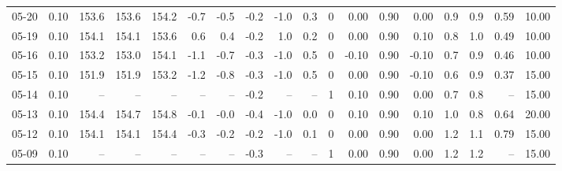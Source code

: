 \begin{threeparttable}
{\begin{tabular}{lrrrrrrrrrrrrrrrrr}
  05-20 &     0.10 & 153.6 & 153.6 & 154.2 &       -0.7 &           -0.5 &                      -0.2 &                     -1.0 &                 0.3 &              0 &       0.00 &      0.90 &           0.00 &              0.9 &                 0.9 &            0.59 &                  10.00 \\
  05-19 &     0.10 & 154.1 & 154.1 & 153.6 &        0.6 &            0.4 &                      -0.2 &                      1.0 &                 0.2 &              0 &       0.00 &      0.90 &           0.10 &              0.8 &                 1.0 &            0.49 &                  10.00 \\
  05-16 &     0.10 & 153.2 & 153.0 & 154.1 &       -1.1 &           -0.7 &                      -0.3 &                     -1.0 &                 0.5 &              0 &      -0.10 &      0.90 &          -0.10 &              0.7 &                 0.9 &            0.46 &                  10.00 \\
  05-15 &     0.10 & 151.9 & 151.9 & 153.2 &       -1.2 &           -0.8 &                      -0.3 &                     -1.0 &                 0.5 &              0 &       0.00 &      0.90 &          -0.10 &              0.6 &                 0.9 &            0.37 &                  15.00 \\
  05-14 &     0.10 &    -- &    -- &    -- &         -- &             -- &                      -0.2 &                       -- &                  -- &              1 &       0.10 &      0.90 &           0.00 &              0.7 &                 0.8 &              -- &                  15.00 \\
  05-13 &     0.10 & 154.4 & 154.7 & 154.8 &       -0.1 &           -0.0 &                      -0.4 &                     -1.0 &                 0.0 &              0 &       0.10 &      0.90 &           0.10 &              1.0 &                 0.8 &            0.64 &                  20.00 \\
  05-12 &     0.10 & 154.1 & 154.1 & 154.4 &       -0.3 &           -0.2 &                      -0.2 &                     -1.0 &                 0.1 &              0 &       0.00 &      0.90 &           0.00 &              1.2 &                 1.1 &            0.79 &                  15.00 \\
  05-09 &     0.10 &    -- &    -- &    -- &         -- &             -- &                      -0.3 &                       -- &                  -- &              1 &       0.00 &      0.90 &           0.00 &              1.2 &                 1.2 &              -- &                  15.00 \\

\end{tabular}}
\end{threeparttable}
